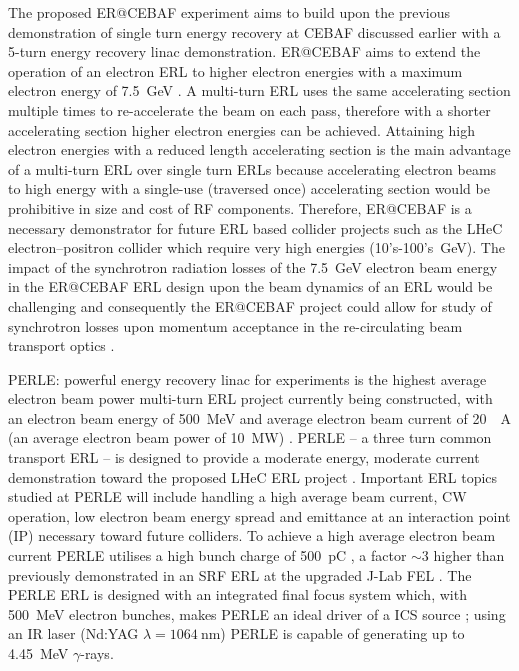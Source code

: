 \documentclass[../main.tex]{subfiles}
\begin{document}
The proposed ER@CEBAF experiment aims to build upon the previous demonstration of single turn energy recovery at CEBAF \cite{bogacz2003cebaf} discussed earlier with a 5-turn energy recovery linac demonstration. ER@CEBAF aims to extend the operation of an electron ERL to higher electron energies with a maximum electron energy of 7.5~\si{\giga\electronvolt} \cite{bogacz2016er,meot2016er}. A multi-turn ERL uses the same accelerating section multiple times to re-accelerate the beam on each pass, therefore with a shorter accelerating section higher electron energies can be achieved. Attaining high electron energies with a reduced length accelerating section is the main advantage of a multi-turn ERL over single turn ERLs because accelerating electron beams to high energy with a single-use (traversed once) accelerating section would be prohibitive in size and cost of RF components. Therefore, ER@CEBAF is a necessary demonstrator for future ERL based collider projects such as the LHeC electron--positron collider \cite{valloni2013strawman,bruning2019exploring,holzer2021accelerator} which require very high energies (10's-100's~\si{\giga\electronvolt}). The impact of the synchrotron radiation losses of the 7.5~\si{\giga\electronvolt} electron beam energy in the ER@CEBAF ERL design upon the beam dynamics of an ERL would be challenging and consequently the ER@CEBAF project could allow for study of synchrotron losses upon momentum acceptance in the re-circulating beam transport optics \cite{adolphsen2022european}.  

PERLE: powerful energy recovery linac for experiments is the highest average electron beam power multi-turn ERL project currently being constructed, with an electron beam energy of 500~\si{\mega\electronvolt} and average electron beam current of 20~\si{\mill\ampere} (an average electron beam power of 10~\si{\mega\watt}) \cite{angal2018perle,bogacz2021perle}. PERLE -- a three turn common transport ERL -- is designed to provide a moderate energy, moderate current demonstration toward the proposed LHeC ERL project \cite{valloni2013strawman,bruning2019exploring,holzer2021accelerator}. Important ERL topics studied at PERLE will include handling a high average beam current, CW operation, low electron beam energy spread and emittance at an interaction point (IP) \cite{adolphsen2022european} necessary toward future colliders. To achieve a high average electron beam current PERLE utilises a high bunch charge of 500~\si{\pico\coulomb} \cite{hounsell2021optimization}, a factor $\sim3$ higher than previously demonstrated in an SRF ERL at the upgraded J-Lab FEL \cite{neil2006jlab}. The PERLE ERL is designed with an integrated final focus system which, with 500~\si{\mega\electronvolt} electron bunches, makes PERLE an ideal driver of a ICS source \cite{adolphsen2022european}; using an IR laser (Nd:YAG $\lambda=1064~\si{\nano\meter}$) PERLE is capable of generating up to 4.45~\si{\mega\electronvolt} $\gamma$-rays.      
\end{document}
